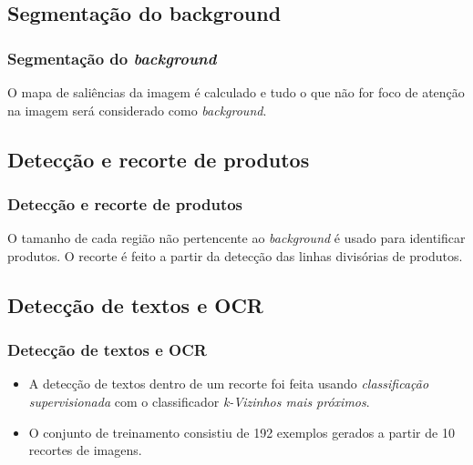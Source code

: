 \documentclass{beamer}
\begin{document}
\subsection{Segmentação do background}

\begin{frame}
\frametitle{Segmentação do \emph{background}}
O mapa de saliências da imagem é calculado e tudo o que não for foco de atenção na imagem será considerado como \emph{background}. 
    
\begin{figure}[!ht]
     \pause
     \pause
\end{figure}

\end{frame}

\subsection{Detecção e recorte de produtos}

\begin{frame}
\frametitle{Detecção e recorte de produtos}

O tamanho de cada região não pertencente ao \emph{background} é usado para identificar produtos. \pause O recorte é feito a partir da detecção das linhas divisórias de produtos. \pause 
            
\begin{figure}[!ht]
     \pause
     \pause
\end{figure}


\end{frame}

\subsection{Detecção de textos e OCR }
\begin{frame}
\frametitle{Detecção de textos e OCR}
    \begin{itemize}
    \item A detecção de textos dentro de um recorte foi feita usando \emph{classificação supervisionada} com o classificador \emph{k-Vizinhos mais próximos}. \pause
    
    
    \item O conjunto de treinamento consistiu de 192 exemplos gerados a partir de 10 recortes de imagens. 
    \end{itemize}
\end{frame}
\end{document}
